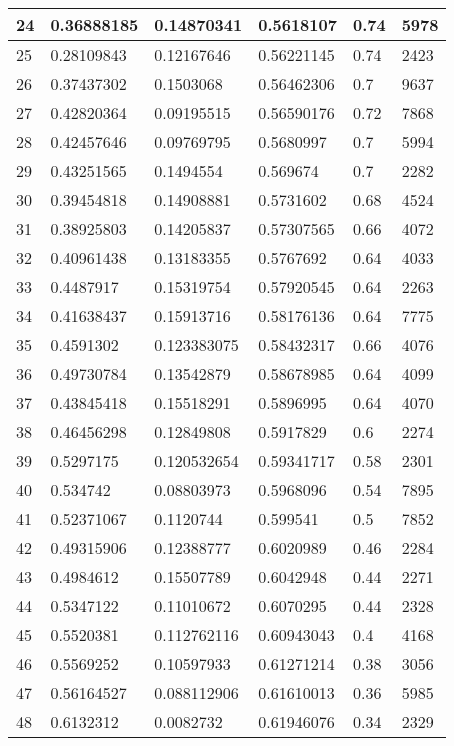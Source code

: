 \begin{longtable}{|l|l|l|l|l|l|}
24 & 0.36888185 & 0.14870341 & 0.5618107 & 0.74 & 5978 \\ \hline 
25 & 0.28109843 & 0.12167646 & 0.56221145 & 0.74 & 2423 \\ \hline 
26 & 0.37437302 & 0.1503068 & 0.56462306 & 0.7 & 9637 \\ \hline 
27 & 0.42820364 & 0.09195515 & 0.56590176 & 0.72 & 7868 \\ \hline 
28 & 0.42457646 & 0.09769795 & 0.5680997 & 0.7 & 5994 \\ \hline 
29 & 0.43251565 & 0.1494554 & 0.569674 & 0.7 & 2282 \\ \hline 
30 & 0.39454818 & 0.14908881 & 0.5731602 & 0.68 & 4524 \\ \hline 
31 & 0.38925803 & 0.14205837 & 0.57307565 & 0.66 & 4072 \\ \hline 
32 & 0.40961438 & 0.13183355 & 0.5767692 & 0.64 & 4033 \\ \hline 
33 & 0.4487917 & 0.15319754 & 0.57920545 & 0.64 & 2263 \\ \hline 
34 & 0.41638437 & 0.15913716 & 0.58176136 & 0.64 & 7775 \\ \hline 
35 & 0.4591302 & 0.123383075 & 0.58432317 & 0.66 & 4076 \\ \hline 
36 & 0.49730784 & 0.13542879 & 0.58678985 & 0.64 & 4099 \\ \hline 
37 & 0.43845418 & 0.15518291 & 0.5896995 & 0.64 & 4070 \\ \hline 
38 & 0.46456298 & 0.12849808 & 0.5917829 & 0.6 & 2274 \\ \hline 
39 & 0.5297175 & 0.120532654 & 0.59341717 & 0.58 & 2301 \\ \hline 
40 & 0.534742 & 0.08803973 & 0.5968096 & 0.54 & 7895 \\ \hline 
41 & 0.52371067 & 0.1120744 & 0.599541 & 0.5 & 7852 \\ \hline 
42 & 0.49315906 & 0.12388777 & 0.6020989 & 0.46 & 2284 \\ \hline 
43 & 0.4984612 & 0.15507789 & 0.6042948 & 0.44 & 2271 \\ \hline 
44 & 0.5347122 & 0.11010672 & 0.6070295 & 0.44 & 2328 \\ \hline 
45 & 0.5520381 & 0.112762116 & 0.60943043 & 0.4 & 4168 \\ \hline 
46 & 0.5569252 & 0.10597933 & 0.61271214 & 0.38 & 3056 \\ \hline 
47 & 0.56164527 & 0.088112906 & 0.61610013 & 0.36 & 5985 \\ \hline 
48 & 0.6132312 & 0.0082732 & 0.61946076 & 0.34 & 2329 \\ \hline 

\end{longtable}

